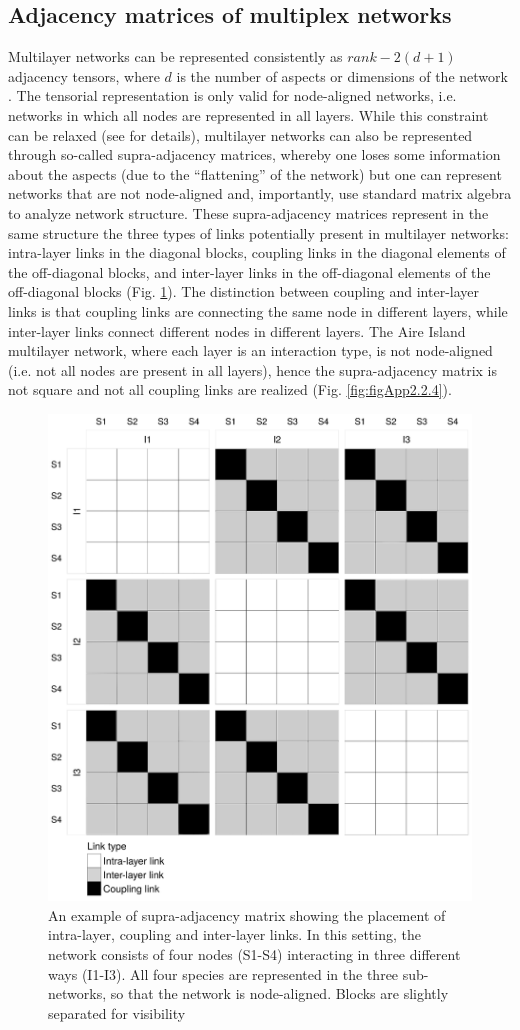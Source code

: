 \subsection*{Adjacency matrices of multiplex networks}

Multilayer networks can be represented consistently as $rank-2(d + 1)$ adjacency tensors, where $d$ is the number of aspects or dimensions of the network \citep{Kivela2014}. The tensorial representation is only valid for node-aligned networks, i.e. networks in which all nodes are represented in all layers. While this constraint can be relaxed (see \citealt{Kivela2014} for details), multilayer networks can also be represented through so-called supra-adjacency matrices, whereby one loses some information about the aspects (due to the ``flattening'' of the network) but one can represent networks that are not node-aligned and, importantly, use standard matrix algebra to analyze network structure. These supra-adjacency matrices represent in the same structure the three types of links potentially present in multilayer networks: intra-layer links in the diagonal blocks, coupling links in the diagonal elements of the off-diagonal blocks, and inter-layer links in the off-diagonal elements of the off-diagonal blocks (Fig. \ref{fig:figApp2.2.3}). The distinction between coupling and inter-layer links is that coupling links are connecting the same node in different layers, while inter-layer links connect different nodes in different layers. The Aire Island multilayer network, where each layer is an interaction type, is not node-aligned (i.e. not all nodes are present in all layers), hence the supra-adjacency matrix is not square and not all coupling links are realized (Fig. \ref{fig:figApp2.2.4}).

\begin{figure}[ht]
\centering
\includegraphics[width=.5\textwidth]{./Figures/Appendix2_2/MLN_supra_adjacency_example.png}
\caption[Multilayer supra adjacency matrix]{\color{Gray} An example of supra-adjacency matrix showing the placement of intra-layer, coupling and inter-layer links. In this setting, the network consists of four nodes (S1-S4) interacting in three different ways (I1-I3). All four species are represented in the three sub-networks, so that the network is node-aligned. Blocks are slightly separated for visibility}
\label{fig:figApp2.2.3}
\end{figure}

